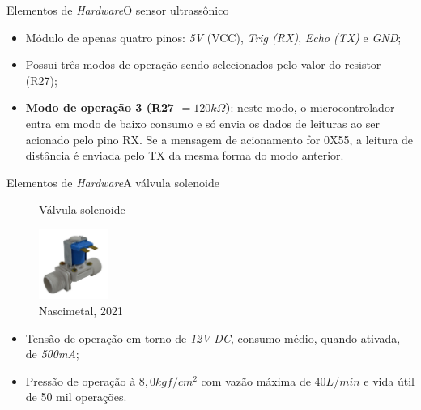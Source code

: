 \begin{frame}{Elementos de \textit{Hardware}}{O sensor ultrassônico}
  \begin{itemize}
      \item Módulo de apenas quatro pinos: \textit{5V} (VCC), \textit{Trig (RX)}, \textit{Echo (TX)} e \textit{GND};
      \item Possui três modos de operação sendo selecionados pelo valor do resistor (R27);
      \item \textbf{Modo de operação 3 (R27 $= 120k\Omega$)}: neste modo, o microcontrolador entra em modo de baixo consumo e só envia os dados de leituras ao ser acionado pelo pino RX. Se a mensagem de acionamento for 0X55, a leitura de distância é enviada pelo TX da mesma forma do modo anterior.
  \end{itemize}    

\end{frame}

\begin{frame}{Elementos de \textit{Hardware}}{A válvula solenoide}
    \begin{figure}[H]
        \centering
        \caption{Válvula solenoide}
        \includegraphics[width=0.2\textwidth]{figuras/solenoide.jpg}
        \caption*{\tiny{Nascimetal, 2021}}
        \label{fig:solenoide}
    \end{figure}

    \begin{itemize}
        \item Tensão de operação em torno de \textit{12V} \textit{DC}, consumo médio, quando ativada, de \textit{500mA};
        \item Pressão de operação à $8,0 kgf/cm^2$ com vazão máxima de $40L/min$ e vida útil de 50 mil operações.
    \end{itemize}    
  
\end{frame}

